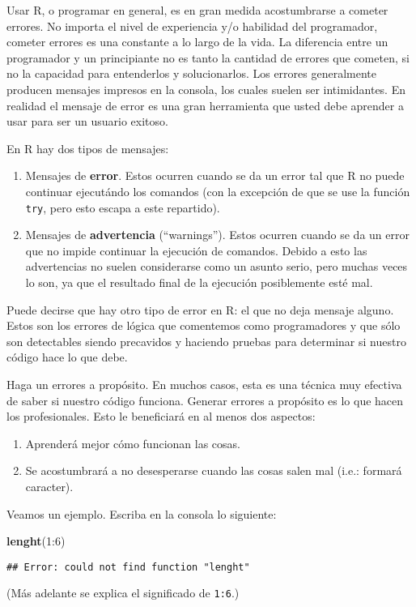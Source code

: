 \documentclass[]{article}
\newenvironment{Shaded}{}{}
\newcommand{\KeywordTok}[1]{\textcolor[rgb]{0.00,0.44,0.13}{\textbf{{#1}}}}
\newcommand{\DecValTok}[1]{\textcolor[rgb]{0.25,0.63,0.44}{{#1}}}
\newcommand{\NormalTok}[1]{{#1}}
\begin{document}
Usar R, o programar en general, es en gran medida acostumbrarse a
cometer errores. No importa el nivel de experiencia y/o habilidad del
programador, cometer errores es una constante a lo largo de la vida. La
diferencia entre un programador y un principiante no es tanto la
cantidad de errores que cometen, si no la capacidad para entenderlos y
solucionarlos. Los errores generalmente producen mensajes impresos en la
consola, los cuales suelen ser intimidantes. En realidad el mensaje de
error es una gran herramienta que usted debe aprender a usar para ser un
usuario exitoso.

En R hay dos tipos de mensajes:

\begin{enumerate}[1.]
\item
  Mensajes de \textbf{error}. Estos ocurren cuando se da un error tal
  que R no puede continuar ejecutándo los comandos (con la excepción de
  que se use la función \texttt{try}, pero esto escapa a este
  repartido).
\item
  Mensajes de \textbf{advertencia} (``warnings''). Estos ocurren cuando
  se da un error que no impide continuar la ejecución de comandos.
  Debido a esto las advertencias no suelen considerarse como un asunto
  serio, pero muchas veces lo son, ya que el resultado final de la
  ejecución posiblemente esté mal.
\end{enumerate}
Puede decirse que hay otro tipo de error en R: el que no deja mensaje
alguno. Estos son los errores de lógica que comentemos como
programadores y que sólo son detectables siendo precavidos y haciendo
pruebas para determinar si nuestro código hace lo que debe.

Haga un errores a propósito. En muchos casos, esta es una técnica muy
efectiva de saber si nuestro código funciona. Generar errores a
propósito es lo que hacen los profesionales. Esto le beneficiará en al
menos dos aspectos:

\begin{enumerate}[1.]
\item
  Aprenderá mejor cómo funcionan las cosas.
\item
  Se acostumbrará a no desesperarse cuando las cosas salen mal (i.e.:
  formará caracter).
\end{enumerate}
Veamos un ejemplo. Escriba en la consola lo siguiente:

\begin{Shaded}
\begin{Highlighting}[]
\KeywordTok{lenght}\NormalTok{(}\DecValTok{1}\NormalTok{:}\DecValTok{6}\NormalTok{)}
\end{Highlighting}
\end{Shaded}
\begin{verbatim}
## Error: could not find function "lenght"
\end{verbatim}
(Más adelante se explica el significado de \texttt{1:6}.)
\end{document}
